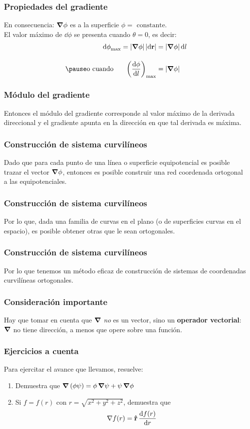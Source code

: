\documentclass[12pt]{beamer}
\begin{document}
\begin{frame}
\frametitle{Propiedades del gradiente}
En consecuencia: $\grad{\phi}$ es  a la superficie $\phi = \text{ constante}$.
\\
\bigskip
\pause
El valor máximo de $\dd{\phi}$ se presenta cuando $\theta = 0$, es decir:
\pause
\begin{eqnarray*}
\begin{aligned}
\dd{\phi}_{\max} = \abs{\grad{\phi}} \, \abs{\dd{\vb{r}}} &= \abs{\grad{\phi}} \dd{l} \\[1em] \pause
\text{o cuando } \hspace{0.5cm} \left( \dv{\phi}{l} \right)_{\max} &= \abs{\grad{\phi}}
\end{aligned}
\end{eqnarray*}
\end{frame}
\begin{frame}
\frametitle{Módulo del gradiente}
Entonces el módulo del gradiente corresponde al valor máximo de la derivada direccional y el gradiente apunta en la dirección en que tal derivada es máxima.
\end{frame}
\begin{frame}
\frametitle{Construcción de sistema curvilíneos}
Dado que para cada punto de una línea o superficie equipotencial es posible trazar el vector $\grad{\phi}$, entonces es posible construir una red coordenada ortogonal a las equipotenciales.
\end{frame}
\begin{frame}
\frametitle{Construcción de sistema curvilíneos}
Por lo que, dada una familia de curvas en el plano (o de superficies curvas en el espacio), es posible obtener otras que le sean ortogonales.
\end{frame}
\begin{frame}
\frametitle{Construcción de sistema curvilíneos}
Por lo que tenemos un método eficaz de construcción de sistemas de coordenadas curvilíneas ortogonales.
\end{frame}
\begin{frame}
\frametitle{Consideración importante}
Hay que tomar en cuenta que $\grad$ \emph{no} es un vector, sino un \textbf{operador vectorial}: $\grad$ no tiene dirección, a menos que opere sobre una función.
\end{frame}
\begin{frame}
\frametitle{Ejercicios a cuenta}
Para ejercitar el avance que llevamos, resuelve:
\begin{enumerate}
\item Demuestra que $\grad{\left( \phi \psi \right)} = \phi \, \grad{\psi} + \psi \, \grad{\phi}$
\item Si $f = f(r)$ con $r = \sqrt{x^{2} + y^{2}+ z^{2}}$, demuestra que
\begin{align*}
\nabla{f(r)} = \vu{r} \, \dv{f(r)}{r}
\end{align*}
\end{enumerate}
\end{frame}
\end{document}
